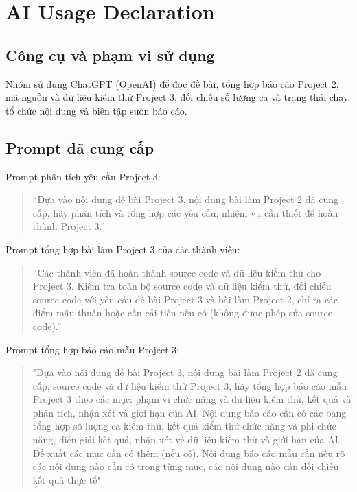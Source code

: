 \section{AI Usage Declaration}
\label{sec:ai-declaration}

\subsection{Công cụ và phạm vi sử dụng}
Nhóm sử dụng ChatGPT (OpenAI) để đọc đề bài, tổng hợp báo cáo Project 2, mã nguồn và dữ liệu kiểm thử Project 3, đối chiếu số lượng ca và trạng thái chạy, tổ chức nội dung và biên tập sườn báo cáo.

\subsection{Prompt đã cung cấp}
Prompt phân tích yêu cầu Project 3:
\begin{quote}
“Dựa vào nội dung đề bài Project 3, nội dung bài làm Project 2 đã cung cấp, hãy phân tích và tổng hợp các yêu cầu, nhiệm vụ cần thiết để hoàn thành Project 3.”
\end{quote}

\noindent
Prompt tổng hợp bài làm Project 3 của các thành viên:
\begin{quote}
“Các thành viên đã hoàn thành source code và dữ liệu kiểm thử cho Project 3. Kiểm tra toàn bộ source code và dữ liệu kiểm thử, đối chiếu source code với yêu cầu đề bài Project 3 và bài làm Project 2, chỉ ra các điểm mâu thuẫn hoặc cần cải tiến nếu có (không được phép sửa source code).”
\end{quote}

\noindent
Prompt tổng hợp báo cáo mẫu Project 3:
\begin{quote}
"Dựa vào nội dung đề bài Project 3, nội dung bài làm Project 2 đã cung cấp, source code và dữ liệu kiểm thử Project 3, hãy tổng hợp báo cáo mẫu Project 3 theo các mục: phạm vi chức năng và dữ liệu kiểm thử, kết quả và phân tích, nhận xét và giới hạn của AI. Nội dung báo cáo cần có các bảng tổng hợp số lượng ca kiểm thử, kết quả kiểm thử chức năng và phi chức năng, diễn giải kết quả, nhận xét về dữ liệu kiểm thử và giới hạn của AI. Đề xuất các mục cần có thêm (nếu có). Nội dung báo cáo mẫu cần nêu rõ các nội dung nào cần có trong từng mục, các nội dung nào cần đối chiếu kết quả thực tế"
\end{quote}
